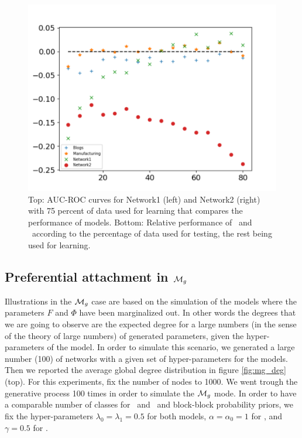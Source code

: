 \begin{figure}[ht]
\begin{minipage}{0.5\textwidth}
        \includegraphics[width=\textwidth]{img/corpus/testset_max_20}
    \end{minipage}
    \caption{Top: AUC-ROC curves for Network1 (left) and Network2 (right) with 75 percent of data used for learning that compares the performance of models. Bottom: Relative performance of \imb\ and \ifm\ according to the percentage of data used for testing, the rest being used for learning.} 
\label{fig:auc}
\end{figure}


\subsection{Preferential attachment in $\mathcal{M}_g$}

Illustrations in the $\mathcal{M}_g$ case are based on the simulation of the models where the parameters $F$ and $\Phi$ have been marginalized out. In other words the degrees that we are going to observe are the expected degree for a large numbers (in the sense of the theory of large numbers) of generated parameters, given the hyper-parameters of the model. In order to simulate this scenario, we generated a large number (100) of networks with a given set of hyper-parameters for the models. Then we reported the average global degree distribution in figure \ref{fig:mg_deg} (top).  For  this  experiments, fix the number of nodes to 1000. We went trough the generative process 100 times in order to simulate the $\mathcal{M}_g$ mode. In order to have a comparable number of classes for \ifm\ and \imb\ and block-block probability priors, we fix the hyper-parameters  $\lambda_0=\lambda_1=0.5$ for both models,  $\alpha=\alpha_0=1$ for \ifm, and  $\gamma=0.5$ for \imb.

